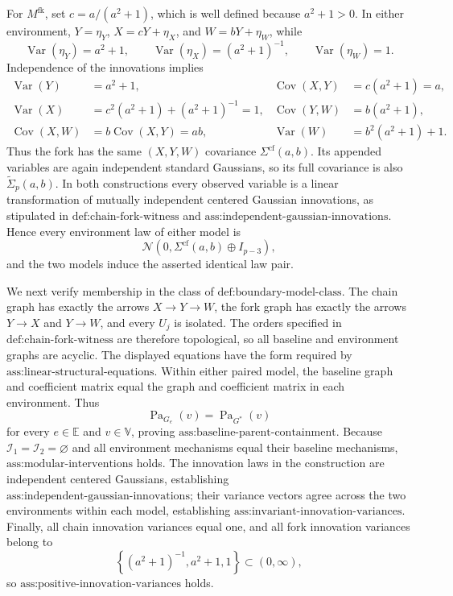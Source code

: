 For \(M^{\mathrm{fk}}\), set \(c=a/(a^2+1)\), which is well defined because \(a^2+1>0\).  In either environment, \(Y=\eta_Y\), \(X=cY+\eta_X\), and \(W=bY+\eta_W\), while
\[
 \operatorname{Var}(\eta_Y)=a^2+1,
 \qquad
 \operatorname{Var}(\eta_X)=(a^2+1)^{-1},
 \qquad
 \operatorname{Var}(\eta_W)=1.
\]
Independence of the innovations implies
\[
\begin{aligned}
 \operatorname{Var}(Y)&=a^2+1,
 &\operatorname{Cov}(X,Y)&=c(a^2+1)=a,\\
 \operatorname{Var}(X)&=c^2(a^2+1)+(a^2+1)^{-1}=1,
 &\operatorname{Cov}(Y,W)&=b(a^2+1),\\
 \operatorname{Cov}(X,W)&=b\operatorname{Cov}(X,Y)=ab,
 &\operatorname{Var}(W)&=b^2(a^2+1)+1.
\end{aligned}
\]
Thus the fork has the same \((X,Y,W)\) covariance \(\Sigma^{\mathrm{cf}}(a,b)\).  Its appended variables are again independent standard Gaussians, so its full covariance is also \(\widetilde\Sigma_p(a,b)\).  In both constructions every observed variable is a linear transformation of mutually independent centered Gaussian innovations, as stipulated in \(\text{def:chain-fork-witness}\) and \(\text{ass:independent-gaussian-innovations}\).  Hence every environment law of either model is
\[
 \mathcal N\!\left(0,\Sigma^{\mathrm{cf}}(a,b)\oplus I_{p-3}\right),
\]
and the two models induce the asserted identical law pair.

We next verify membership in the class of \(\text{def:boundary-model-class}\).  The chain graph has exactly the arrows \(X\to Y\to W\), the fork graph has exactly the arrows \(Y\to X\) and \(Y\to W\), and every \(U_j\) is isolated.  The orders specified in \(\text{def:chain-fork-witness}\) are therefore topological, so all baseline and environment graphs are acyclic.  The displayed equations have the form required by \(\text{ass:linear-structural-equations}\).  Within either paired model, the baseline graph and coefficient matrix equal the graph and coefficient matrix in each environment.  Thus
\[
 \operatorname{Pa}_{G_e}(v)=\operatorname{Pa}_{G^*}(v)
\]
for every \(e\in\mathbb E\) and \(v\in\mathbb V\), proving \(\text{ass:baseline-parent-containment}\).  Because \(\mathcal I_1=\mathcal I_2=\varnothing\) and all environment mechanisms equal their baseline mechanisms, \(\text{ass:modular-interventions}\) holds.  The innovation laws in the construction are independent centered Gaussians, establishing \(\text{ass:independent-gaussian-innovations}\); their variance vectors agree across the two environments within each model, establishing \(\text{ass:invariant-innovation-variances}\).  Finally, all chain innovation variances equal one, and all fork innovation variances belong to
\[
 \left\{(a^2+1)^{-1},a^2+1,1\right\}\subset(0,\infty),
\]
so \(\text{ass:positive-innovation-variances}\) holds.

